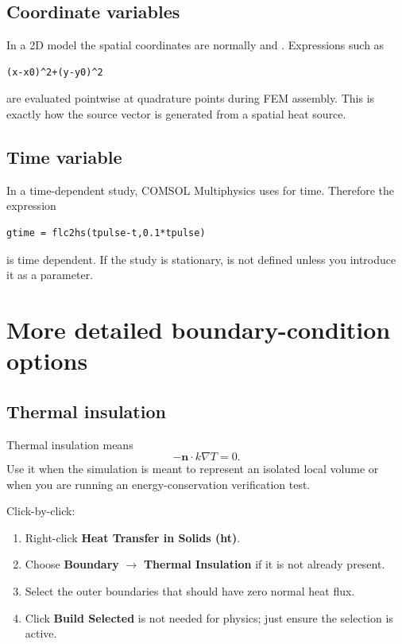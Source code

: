 \documentclass[11pt]{article}
\newcommand{\COMSOL}{COMSOL Multiphysics}
\newcommand{\comsol}{\COMSOL}
\newcommand{\type}[1]{\texttt{\detokenize{#1}}}
\newcommand{\menu}[1]{\textbf{#1}}
\begin{document}
\subsection{Coordinate variables}
In a 2D model the spatial coordinates are normally \type{x} and \type{y}.  Expressions such as
\begin{lstlisting}
(x-x0)^2+(y-y0)^2
\end{lstlisting}
are evaluated pointwise at quadrature points during FEM assembly.  This is exactly how the source vector is generated from a spatial heat source.

\subsection{Time variable}
In a time-dependent study, \comsol{} uses \type{t} for time.  Therefore the expression
\begin{lstlisting}
gtime = flc2hs(tpulse-t,0.1*tpulse)
\end{lstlisting}
is time dependent.  If the study is stationary, \type{t} is not defined unless you introduce it as a parameter.

\section{More detailed boundary-condition options}

\subsection{Thermal insulation}
Thermal insulation means
\begin{equation}
-\mathbf{n}\cdot k\nabla T=0.
\end{equation}
Use it when the simulation is meant to represent an isolated local volume or when you are running an energy-conservation verification test.

Click-by-click:
\begin{enumerate}
\item Right-click \menu{Heat Transfer in Solids (ht)}.
\item Choose \menu{Boundary} \(\rightarrow\) \menu{Thermal Insulation} if it is not already present.
\item Select the outer boundaries that should have zero normal heat flux.
\item Click \menu{Build Selected} is not needed for physics; just ensure the selection is active.
\end{enumerate}
\end{document}
